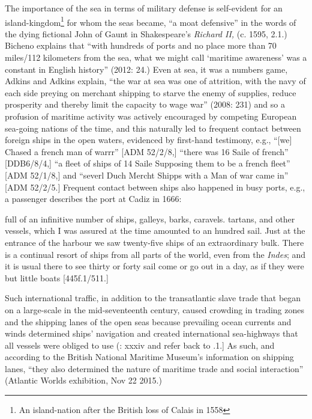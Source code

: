 The importance of the sea in terms of military defense is self-evident for an island-kingdom\footnote{An island-nation after the British loss of Calais in 1558} for whom the seas became, “a moat defensive” in the words of the dying fictional John of Gaunt in Shakespeare’s \textit{Richard II,} (c. 1595, 2.1.) Bicheno explains that “with hundreds of ports and no place more than 70 miles/112 kilometers from the sea, what we might call ‘maritime awareness’ was a constant in English history” (2012: 24.) Even at sea, it was a numbers game, Adkins and Adkins explain, “the war at sea was one of attrition, with the navy of each side preying on merchant shipping to starve the enemy of supplies, reduce prosperity and thereby limit the capacity to wage war” (2008: 231) and so a profusion of maritime activity was actively encouraged by competing European sea-going nations of the time, and this naturally led to frequent contact between foreign ships in the open waters, evidenced by first-hand testimony, e.g., “[we] Chased a french man of warrr” [ADM 52/2/8,] “there was 16 Saile of french” [DDB6/8/4,] “a fleet of ships of 14 Saile Supposing them to be a french fleet” [ADM 52/1/8,] and “severl Duch Mercht Shipps with a Man of war came in” [ADM 52/2/5.] Frequent contact between ships also happened in busy ports, e.g., a passenger describes the port at Cadiz in 1666:

full of an infinitive number of ships, galleys, barks, caravels. tartans, and other vessels, which I was assured at the time amounted to an hundred sail. Just at the entrance of the harbour we saw twenty-five ships of an extraordinary bulk. There is a continual resort of ships from all parts of the world, even from the \textit{Indes}; and it is usual there to see thirty or forty sail come or go out in a day, as if they were but little boats [445f.1/511.] 

Such international traffic, in addition to the transatlantic slave trade that began on a large-scale in the mid-seventeenth century, caused crowding in trading zones and the shipping lanes of the open seas because prevailing ocean currents and winds determined ships’ navigation and created international sea-highways that all vessels were obliged to use (\citealt{AdkinsAdkins2008}: xxxiv and refer back to .1.] As such, and according to the British National Maritime Museum’s information on shipping lanes, “they also determined the nature of maritime trade and social interaction” (Atlantic Worlds exhibition, Nov 22 2015.)  

